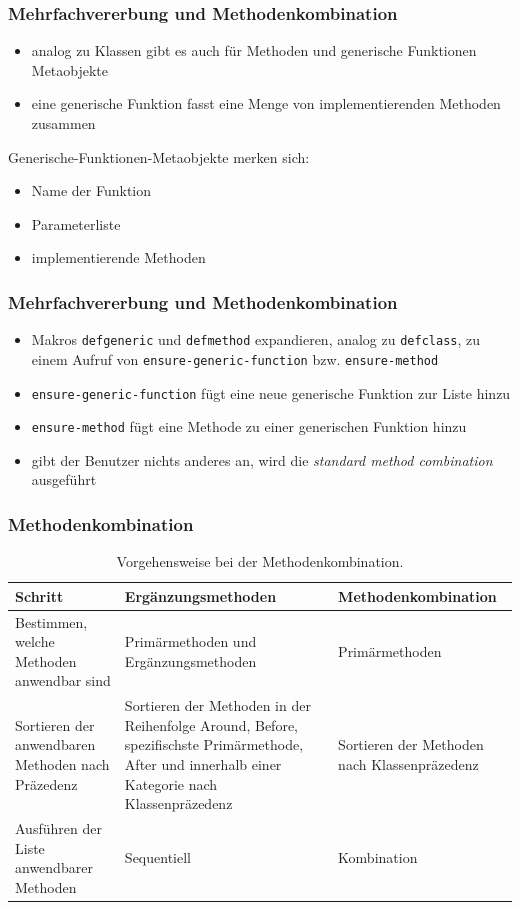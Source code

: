 \documentclass{beamer}
\begin{document}
\begin{frame}[fragile]
 \frametitle{Mehrfachvererbung und Methodenkombination}
 \begin{itemize}
  \item analog zu Klassen gibt es auch für Methoden und generische Funktionen Metaobjekte
  \item eine generische Funktion fasst eine Menge von implementierenden Methoden zusammen
 \end{itemize}
 \vspace{0.5cm}
 Generische-Funktionen-Metaobjekte merken sich:
 \begin{itemize}
  \item Name der Funktion
  \item Parameterliste
  \item implementierende Methoden
 \end{itemize}

\end{frame}

\begin{frame}[fragile]
 \frametitle{Mehrfachvererbung und Methodenkombination}
 \begin{itemize}
  \item Makros \texttt{defgeneric} und \texttt{defmethod} expandieren, analog zu \texttt{defclass}, zu einem Aufruf von \texttt{ensure-generic-function} bzw. \texttt{ensure-method}
  \item \texttt{ensure-generic-function} fügt eine neue generische Funktion zur Liste hinzu
  \item \texttt{ensure-method} fügt eine Methode zu einer generischen Funktion hinzu
  \item gibt der Benutzer nichts anderes an, wird die \textit{standard method combination} ausgeführt
 \end{itemize}
\end{frame}

\begin{frame}
 \frametitle{Methodenkombination}
 \begin{center}
  \begin{table}[h]\small
\begin{tabular}{|p{2.8cm}|p{3.3cm}|p{3.6cm}|}
 \hline
 \textbf{Schritt} & \textbf{Ergänzungsmethoden} & \textbf{Methodenkombination}\\\hline
 Bestimmen, welche Methoden anwendbar sind & Primärmethoden und Ergänzungsmethoden & Primärmethoden \\\hline
 Sortieren der anwendbaren Methoden nach Präzedenz & Sortieren der Methoden in der Reihenfolge Around, Before, spezifischste Primärmethode, After und innerhalb einer Kategorie nach Klassenpräzedenz & Sortieren der Methoden nach Klassenpräzedenz\\\hline
 Ausführen der Liste anwendbarer Methoden & Sequentiell & Kombination\\\hline
\end{tabular}
 \caption{Vorgehensweise bei der Methodenkombination.}
 \label{combination}
\end{table}
 \end{center}
\end{frame}
\end{document}
